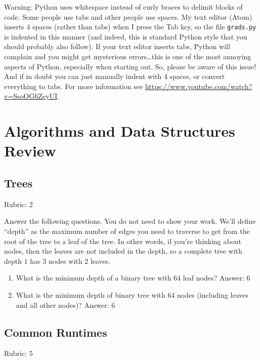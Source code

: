 \documentclass{article}
\newcommand{\ans}[1]{\green{Answer: #1}}
\newcommand{\rubric}[1]{\green{Rubric: #1}}
\newcommand{\blue}[1]{{\color{blue}#1}}
\newcommand{\green}[1]{{\color{green}#1}}
\begin{document}
    Warning: Python uses whitespace instead of curly braces to delimit blocks of code.
    Some people use tabs and other people use spaces. My text editor (Atom) inserts 4 spaces (rather than tabs) when
    I press the Tab key, so the file \texttt{grads.py} is indented in this manner (and indeed, this is standard Python style that you should probably also follow). If your text editor inserts tabs,
    Python will complain and you might get mysterious errors\ldots this is one of the most annoying aspects
    of Python, especially when starting out. So, please be aware of this issue! And if in doubt you can just manually
    indent with 4 spaces, or convert everything to tabs. For more information
    see \url{https://www.youtube.com/watch?v=SsoOG6ZeyUI}.


    \section{Algorithms and Data Structures Review}

    \subsection{Trees}
    \rubric{2}

    \blue{Answer the following questions.} You do not need to show your work. We'll define ``depth'' as the maximum number of edges you need to traverse to get from the root of the tree to a leaf of the tree. In other words, if you're thinking about nodes, then the leaves are not included in the depth, so a complete tree with depth $1$ has 3 nodes with 2 leaves.


    \begin{enumerate}
        \item What is the minimum depth of a binary tree with 64 leaf nodes? \ans{6}
        \item What is the minimum depth of binary tree with 64 nodes (including leaves and all other nodes)? \ans{6}
    \end{enumerate}

    \subsection{Common Runtimes}
    \rubric{5}
\end{document}
